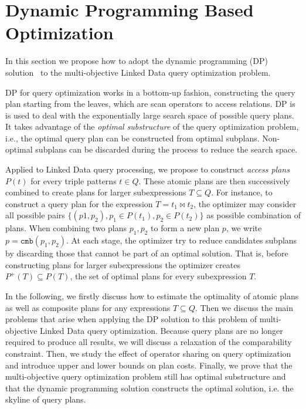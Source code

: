 \section{Dynamic Programming Based Optimization}
\label{sec:opt}
In this section we propose how to adopt the dynamic
programming (DP) solution~\cite{selinger_access_1979} to the 
multi-objective Linked Data query optimization problem. 

DP for query optimization works in a
bottom-up fashion, constructing the query plan starting from the
leaves, which are scan operators to access
relations. DP is is used to deal with the
exponentially large search space of possible query plans. It takes
advantage of the \emph{optimal substructure} of the query optimization
problem, i.e., the optimal query plan can be constructed from
optimal subplans. Non-optimal subplans can be
discarded during the process to reduce the search space.


Applied to Linked Data query processing, we propose to construct \emph{access plans} $P(t)$ for every triple patterns $t \in Q$. These atomic plans are then successively combined 
to create plans for larger subexpressions $T \subseteq Q$. 
For instance, to construct a query plan for the expression $T=t_1\Join t_2$, the optimizer may consider all possible pairs $\{(p1,p_2), p_1 \in P(t_1),p_2 \in P(t_2)\}$ as possible combination of plans. When combining two plans $p_1,p_2$ to form a new plan $p$, we
write $p = \mathtt{cmb}(p_1,p_2)$. At each stage, the optimizer 
try to reduce candidates subplans by discarding those that cannot be part of an optimal solution. That is, before constructing plans for larger subexpressions the optimizer creates $P^+(T) \subseteq
P(T)$, the set of optimal plans for every subexpression $T$. 


In the following, we firstly discuss how to estimate the optimality of atomic plans as well as composite plans for any expressions $T \subseteq Q$. Then we discuss the main problems that arise when applying the DP solution to this problem of multi-objective Linked Data query optimization.  Because query plans are no longer required to produce all results, we will
discuss a relaxation of the comparability constraint. Then, we study the effect of operator sharing on query optimization and introduce upper and lower bounds on plan
costs. Finally, we prove that the multi-objective query optimization problem still has optimal
substructure and that the dynamic programming solution constructs the
optimal solution, i.e. the skyline of query plans.

